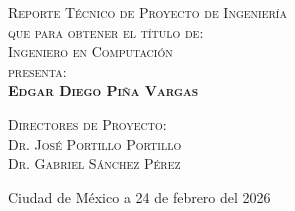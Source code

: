\begin{titlepage}
\begin{minipage}[c][0.81\textheight][t]{0.75\textwidth}
\begin{center}
      \vspace{2cm}            

      \textsc{Reporte Técnico de Proyecto de Ingeniería}\\[1cm]
      \textsc{que para obtener el título de:}\\[0.5cm]
      \textsc{\Large Ingeniero en Computación}\\[0.5cm]
      
      {\color{black}\textsc{\large presenta:}}\\[0.5cm]
      \textsc{\textbf{Edgar Diego Piña Vargas}}\\

      \vspace{1 cm}

      {\scshape 
        {\color{black}Directores de Proyecto:}\\[0.3cm]{}
        {Dr. José Portillo Portillo\\ 
         Dr. Gabriel Sánchez Pérez}}\\

      \vspace{2 cm}

      \large{Ciudad de México a 24 de febrero del 2026}
    
      
    \end{center}
  \end{minipage}
\end{titlepage}
